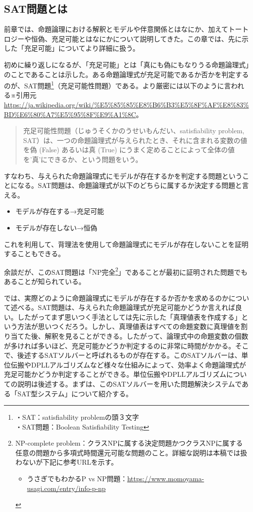 \documentclass[dvipdfmx]{jsarticle}
\begin{document}
\subsection{SAT問題とは}
前章では、命題論理における解釈とモデルや伴意関係とはなにか、加えてトートロジーや恒偽、充足可能とはなにかについて説明してきた。この章では、先に示した「充足可能」についてより詳細に扱う。\par
初めに繰り返しになるが、「充足可能」とは「真にも偽にもなりうる命題論理式」のことであることは示した。ある命題論理式が充足可能であるか否かを判定するのが、SAT問題\footnote{・SAT：satisfiability problemの頭３文字\\・SAT問題：Boolean Satisfiability Testing}（充足可能性問題）である。より厳密には以下のように言われる※引用元\url{https://ja.wikipedia.org/wiki/%E5%85%85%E8%B6%B3%E5%8F%AF%E8%83%BD%E6%80%A7%E5%95%8F%E9%A1%8C}。
\begin{quote}
  充足可能性問題（じゅうそくかのうせいもんだい、satisfiability problem, SAT）は、一つの命題論理式が与えられたとき、それに含まれる変数の値を偽 (False) あるいは真 (True) にうまく定めることによって全体の値を'真'にできるか、という問題をいう。
\end{quote}
すなわち、与えられた命題論理式にモデルが存在するかを判定する問題ということになる。SAT問題は、命題論理式が以下のどちらに属するか決定する問題と言える。
\begin{itemize}
  \item モデルが存在する→充足可能
  \item モデルが存在しない→恒偽
\end{itemize}
これを利用して、背理法を使用して命題論理式にモデルが存在しないことを証明することもできる。\par
余談だが、このSAT問題は「NP完全\footnote{NP-complete problem：クラスNPに属する決定問題かつクラスNPに属する任意の問題から多項式時間還元可能な問題のこと。詳細な説明は本稿では扱わないが下記に参考URLを示す。
\begin{itemize}
  \item うさぎでもわかるP vs NP問題：\url{https://www.momoyama-usagi.com/entry/info-p-np}
\end{itemize}}」であることが最初に証明された問題でもあることが知られている。\par
では、実際どのように命題論理式にモデルが存在するか否かを求めるのかについて述べる。SAT問題は、与えられた命題論理式が充足可能かどうか言えれば良い。したがってまず思いつく手法としては先に示した「真理値表を作成する」という方法が思いつくだろう。しかし、真理値表はすべての命題変数に真理値を割り当てた後、解釈を見ることができる。したがって、論理式中の命題変数の個数が多ければ多いほど、充足可能かどうか判定するのに非常に時間がかかる。そこで、後述するSATソルバーと呼ばれるものが存在する。このSATソルバーは、単位伝搬やDPLLアルゴリズムなど様々な仕組みによって、効率よく命題論理式が充足可能かどうか判定することができる。単位伝搬やDPLLアルゴリズムについての説明は後述する。まずは、このSATソルバーを用いた問題解決システムである「SAT型システム」について紹介する。
\end{document}
